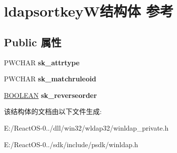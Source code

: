 \hypertarget{structldapsortkey_w}{}\section{ldapsortkey\+W结构体 参考}
\label{structldapsortkey_w}
\subsection*{Public 属性}
\begin{DoxyCompactItemize}
\item 
\mbox{\label{structldapsortkey_w_ac2d2456da35e9fa432ccfa936e83dfcd}} 
P\+W\+C\+H\+AR {\bfseries sk\+\_\+attrtype}
\item 
\mbox{\label{structldapsortkey_w_a1aa77a5ae98759c5cac9e2af940e8933}} 
P\+W\+C\+H\+AR {\bfseries sk\+\_\+matchruleoid}
\item 
\mbox{\label{structldapsortkey_w_ab96d9a3ce0ea93dcb077404354cbb7f2}} 
\hyperlink{_processor_bind_8h_a112e3146cb38b6ee95e64d85842e380a}{B\+O\+O\+L\+E\+AN} {\bfseries sk\+\_\+reverseorder}
\end{DoxyCompactItemize}


该结构体的文档由以下文件生成\+:\begin{DoxyCompactItemize}
\item 
E\+:/\+React\+O\+S-\/0../dll/win32/wldap32/winldap\+\_\+private.\+h\item 
E\+:/\+React\+O\+S-\/0../sdk/include/psdk/winldap.\+h\end{DoxyCompactItemize}
